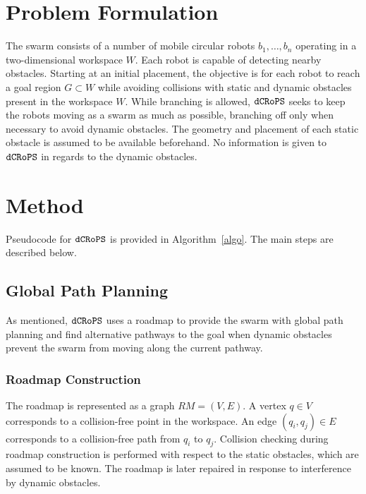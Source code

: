 \documentclass[letterpaper, 10pt, conference]{ieeeconf}
\newcommand{\Acronym}[1]{\ensuremath{{\small{\texttt{#1}}}}}
\newcommand{\Name}{\Acronym{dCRoPS}}
\begin{document}
\section{Problem Formulation}
\label{sec:Problem}
The swarm consists of a number of mobile circular robots $b_1, \ldots,
b_n$ operating in a two-dimensional workspace $W$.  Each robot
is capable of detecting nearby obstacles.  Starting at an initial
placement, the objective is for each robot to reach a goal
region $G \subset W$ while avoiding collisions with static and dynamic
obstacles present in the workspace $W$. While branching is allowed, $\Name$ seeks to keep the
robots moving as a swarm as much as possible, branching off only when
necessary to avoid dynamic obstacles. The geometry and placement of each static obstacle is
assumed to be available beforehand. No information is given to $\Name$
in regards to the dynamic obstacles. 

\section{Method}
\label{sec:Method}

Pseudocode for $\Name$ is provided in Algorithm~\ref{algo}. The
main steps are described below.


\subsection{Global Path Planning}

As mentioned, $\Name$ uses a roadmap to provide the swarm with global
path planning and find alternative pathways to the goal when dynamic obstacles
prevent the swarm from moving along the current pathway. 

\subsubsection{Roadmap Construction}
The roadmap is represented as a graph $RM=(V,E)$. A vertex $q \in V$
corresponds to a collision-free point in the workspace. An edge $(q_i,
q_j) \in E$ corresponds to a collision-free path from $q_i$ to $q_j$.
Collision checking during roadmap construction is performed with
respect to the static obstacles, which are assumed to be known.  The
roadmap is later repaired in response to interference by dynamic
obstacles.
\end{document}
